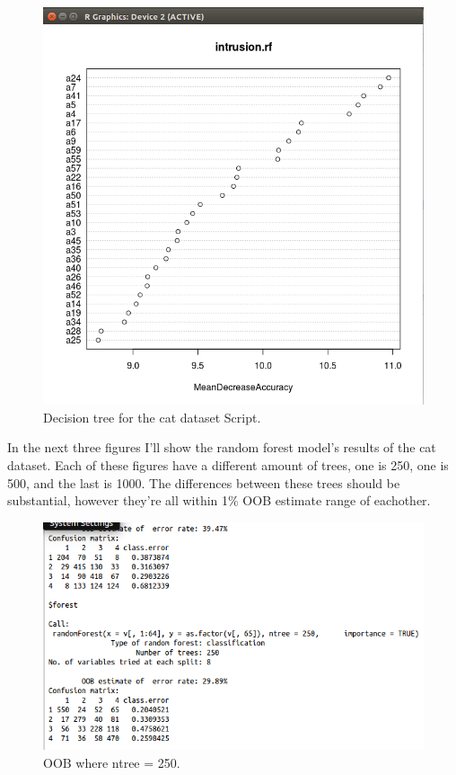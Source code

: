\documentclass[12pt, letterpaper]{article}
\begin{document}
\begin{figure}[H]
\centering
\includegraphics[width=5.0in]{catplot6}
\caption{Decision tree for the cat dataset Script.}
\label{fig:dtcd}
\end{figure}


 In the next three figures I'll show the random forest model's results of the cat dataset. Each of these figures have a different amount of trees, one is 250, one is 500, and the last is 1000. The differences between these trees should be substantial, however they're all within 1\% OOB estimate range of eachother.

\begin{figure}[H]
\centering
\includegraphics[width=5.0in]{catOOB250}
\caption{OOB where ntree = 250.}
\label{fig:oob1}
\end{figure}
\end{document}
